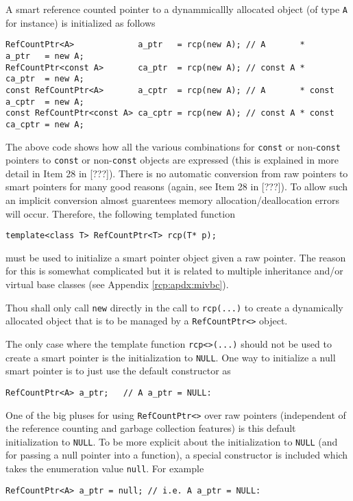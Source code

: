 A smart reference counted pointer to a dynammicallly allocated object
(of type \texttt{A} for instance) is initialized as follows
%
{\scriptsize\begin{verbatim}
RefCountPtr<A>             a_ptr   = rcp(new A); // A       *       a_ptr   = new A;
RefCountPtr<const A>       ca_ptr  = rcp(new A); // const A *       ca_ptr  = new A;
const RefCountPtr<A>       a_cptr  = rcp(new A); // A       * const a_cptr  = new A;
const RefCountPtr<const A> ca_cptr = rcp(new A); // const A * const ca_cptr = new A;
\end{verbatim}}
%
The above code shows how all the various combinations for \texttt{const} or
non-\texttt{const} pointers to \texttt{const} or non-\texttt{const} objects are expressed (this
is explained in more detail in Item 28 in [???]).  There is no
automatic conversion from raw pointers to smart pointers for many good
reasons (again, see Item 28 in [???]).  To allow such an implicit
conversion almost guarentees memory allocation/deallocation errors
will occur.  Therefore, the following templated function
%
{\scriptsize\begin{verbatim}
template<class T> RefCountPtr<T> rcp(T* p);
\end{verbatim}}
%
\noindent{}must be used to initialize a smart pointer object given a
raw pointer.  The reason for this is somewhat complicated but it is
related to multiple inheritance and/or virtual base classes (see
Appendix \ref{rcp:apdx:mivbc}).

\begin{commandment}\label{rcp:cmd:rcp-new}
Thou shall only call \texttt{new} directly
in the call to \texttt{rcp(...)} to create a dynamically allocated
object that is to be managed by a \texttt{RefCountPtr<>} object.
\end{commandment}

The only case where the template function \texttt{rcp<>(...)} should
not be used to create a smart pointer is the initialization to
\texttt{NULL}.  One way to initialize a null smart pointer is to just
use the default constructor as
%
{\scriptsize\begin{verbatim}
RefCountPtr<A> a_ptr;   // A a_ptr = NULL:
\end{verbatim}}
%
One of the big pluses for using \texttt{RefCountPtr<>} over raw
pointers (independent of the reference counting and garbage collection
features) is this default initialization to \texttt{NULL}.
To be more explicit about the initialization to \texttt{NULL} (and for
passing a null pointer into a function), a special constructor is
included which takes the enumeration value \texttt{null}.  For example
%
{\scriptsize\begin{verbatim}
RefCountPtr<A> a_ptr = null; // i.e. A a_ptr = NULL:
\end{verbatim}}
%

